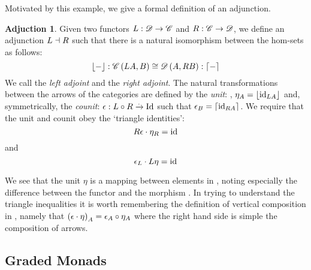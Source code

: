 \theoremstyle{definition}\newtheorem*{adjunctiondef}{Adjuction}
Motivated by this example, we give a formal definition of an adjunction.
\begin{adjunctiondef}
    Given two functors $\mathnormal{L}: \mathscr{D} \to \mathscr{C}$ and $\mathnormal{R}:
    \mathscr{C} \to \mathscr{D}$, we define an adjunction $\mathnormal{L} \dashv \mathnormal{R}$  such that there is a natural isomorphism between the
    hom-sets as follows:\cite{RelationalAlgebraByWayOfAdjunctions}
    \[
        \lfloor - \rfloor: \mathscr{C}\left(\mathnormal{L} \mathnormal{A}, B\right) \cong
        \mathscr{D}\left(A, \mathnormal{R} \mathnormal{B}\right) :\lceil - \rceil
    \]
    We call  the \emph{left adjoint} and  the \emph{right
    adjoint}.
    The natural transformations between the arrows of the categories are defined
    by the \emph{unit}: , $\eta_{A} =
    \lfloor \mathrm{id}_{\mathnormal{\mathnormal{L} \mathnormal{A}}} \rfloor$ and, symmetrically, the
    \emph{counit}:
    $\epsilon: \mathnormal{L \circ R} \xrightarrow{.} \mathnormal{\mathrm{Id}}$ such that
    $\epsilon_{B} = \lceil \mathrm{id}_{\mathnormal{\mathnormal{R} \mathnormal{A}}} \rceil$. We
    require that the unit and counit obey the `triangle identities':
\[
            \mathnormal{R} \mathnormal{\epsilon} \cdot \eta_{\mathnormal{R}}
            = \mathrm{id}_{\mathnormal{}}
\] 
    and
\[
    \epsilon_{\mathnormal{L}} \cdot \mathnormal{L} \mathnormal{\eta}
    = \mathrm{id}_{\mathnormal{}}
\]
\end{adjunctiondef}

We see that the unit $\eta$ is a mapping between elements in , noting
especially the difference between the functor  and the
morphism .
In trying to understand the triangle inequalities it is worth remembering the
definition of vertical composition in , namely
that
$\left(\epsilon \cdot \eta\right)_{\mathnormal{A}} =
\mathnormal{\epsilon_{\mathnormal{A}}} \circ \mathnormal{\eta_{\mathnormal{A}}}$
where the right hand side is simple the composition of arrows.

\subsection{Graded Monads}\label{sec:gradedmonads}
